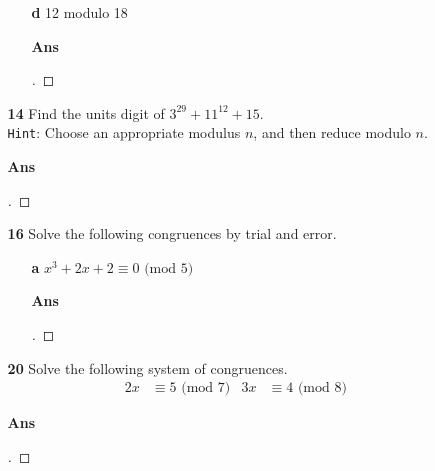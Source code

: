 \documentclass[paper=usletter, fontsize=12pt]{article}
\begin{document}
\begin{itemize}
\begin{itemize}
\begin{itemize}
                \item[\textbf{d}] 12 modulo 18
                \item[\textbf{Ans}]
                \begin{proof}[\unskip\nopunct]
                \end{proof}
                \vspace{0.2in}

            \end{itemize}

            \item[\textbf{14}] Find the units digit of $3^{29}+11^{12}+15$.\\
            \texttt{Hint}: Choose an appropriate modulus $n$, and then reduce
            modulo $n$.
            \item[\textbf{Ans}]
            \begin{proof}[\unskip\nopunct]
            \end{proof}
            \vspace{0.2in}

            \item[\textbf{16}] Solve the following congruences by trial and
            error.
            \begin{itemize}

                \item[\textbf{a}] $x^3+2x+2 \equiv 0 \text{ (mod  5)}$
                \item[\textbf{Ans}]
                \begin{proof}[\unskip\nopunct]
                \end{proof}
                \vspace{0.2in}

            \end{itemize}

            \item[\textbf{20}] Solve the following system of congruences.
            \begin{align*}
                2x & \equiv 5 \text{ (mod  7)} & 3x & \equiv 4 \text{ (mod  8)}
            \end{align*}
            \item[\textbf{Ans}]
            \begin{proof}[\unskip\nopunct]
            \end{proof}
            \vspace{0.2in}

        \end{itemize}

    \end{itemize}
\end{document}
